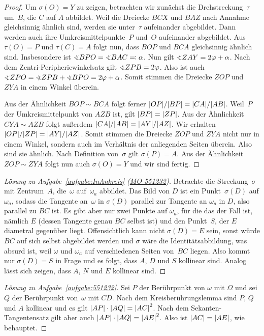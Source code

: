 \begin{proof}
	Um $\sigma(O)=Y$ zu zeigen, betrachten wir zunächst die Drehstreckung~$\tau$ um~$B$, die $C$ auf $A$ abbildet. Weil die Dreiecke $BCX$ und $BAZ$ nach Annahme gleichsinnig ähnlich sind, werden sie unter~$\tau$ aufeinander abgebildet. Dann werden auch ihre Umkreismittelpunkte~$P$ und~$O$ aufeinander abgebildet. Aus $\tau(O)=P$ und $\tau(C)=A$ folgt nun, dass $BOP$ und $BCA$ gleichsinnig ähnlich sind. Insbesondere ist $\winkel BPO=\winkel BAC\eqqcolon\alpha$. Nun gilt $\winkel ZAY=2\varphi+\alpha$. Nach dem Zentri-Peripheriewinkelsatz gilt $\winkel ZPB=2\varphi$. Also ist auch $\winkel ZPO=\winkel ZPB+\winkel BPO=2\varphi+\alpha$. Somit stimmen die Dreiecke $ZOP$ und $ZYA$ in einem Winkel überein.
	
	Aus der Ähnlichkeit $BOP\sim BCA$ folgt ferner $\abs*{OP}/\abs*{BP}=\abs*{CA}/\abs*{AB}$. Weil~$P$ der Umkreismittelpunkt von $AZB$ ist, gilt $\abs*{BP}=\abs*{ZP}$. Aus der Ähnlichkeit $CYA\sim AZB$ folgt außerdem $\abs*{CA}/\abs{AB}=\abs*{AY}/\abs*{AZ}$. Wir erhalten $\abs{OP}/\abs{ZP}=\abs{AY}/\abs{AZ}$. Somit stimmen die Dreiecke $ZOP$ und $ZYA$ nicht nur in einem Winkel, sondern auch im Verhältnis der anliegenden Seiten überein. Also sind sie ähnlich. Nach Definition von~$\sigma$ gilt $\sigma(P)=A$. Aus der Ähnlichkeit $ZOP\sim ZYA$ folgt nun auch $\sigma(O)=Y$ und wir sind fertig.
\end{proof}
\begin{proof}[Lösung zu Aufgabe~\ref{aufgabe:InAnkreis} \textmd{(\href{https://www.mathematik-olympiaden.de/moev/index.php?option=com_download&thema=a&datei=A55123a.pdf&format=raw}{MO 551232})}]
	Betrachte die Streckung~$\sigma$ mit Zentrum~$A$, die~$\omega$ auf~$\omega_a$ abbildet. Das Bild von $D$ ist ein Punkt~$\sigma(D)$ auf $\omega_a$, sodass die Tangente an~$\omega$ in $\sigma(D)$ parallel zur Tangente an $\omega_a$ in $D$, also parallel zu $BC$ ist. Es gibt aber nur zwei Punkte auf $\omega_a$, für die das der Fall ist, nämlich $E$ (dessen Tangente genau $BC$ selbst ist) und den Punkt~$S$, der $E$ diametral gegenüber liegt. Offensichtlich kann nicht $\sigma(D)=E$ sein, sonst würde $BC$ auf sich selbst abgebildet werden und $\sigma$ wäre die Identitätsabbildung, was absurd ist, weil $\omega$ und $\omega_a$ auf verschiedenen Seiten von~$BC$ liegen. Also kommt nur $\sigma(D)=S$ in Frage und es folgt, dass $A$, $D$ und $S$ kollinear sind. Analog lässt sich zeigen, dass $A$, $N$ und $E$ kollinear sind.
\end{proof}
\begin{proof}[Lösung zu Aufgabe~\ref{aufgabe:551232}]
	Sei $P$ der Berührpunkt von $\omega$ mit $\Omega$ und sei $Q$ der Berührpunkt von~$\omega$ mit $\overline{CD}$. Nach dem Kreisberührungslemma sind $P$, $Q$ und $A$ kollinear und es gilt $\abs*{AP}\cdot\abs*{AQ}=\abs*{AC}^2$. Nach dem Sekanten-Tangentensatz gilt aber auch $\abs*{AP}\cdot \abs*{AQ}=\abs*{AE}^2$. Also ist $\abs*{AC}=\abs*{AE}$, wie behauptet.
\end{proof}
